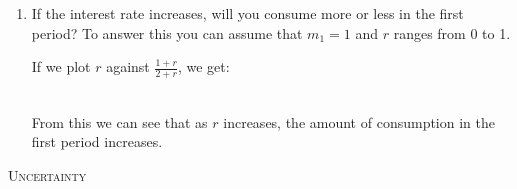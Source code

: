 \documentclass[12pt]{article}
\newcommand{\topic}[1]{\medskip\begin{center}\large\textsc{#1}\normalsize
  \end{center}}
\newcounter{question}[section]
\newcommand{\question}[1]{\refstepcounter{question}
  \subsubsection*{Question~\thequestion~-- #1}}
\newenvironment{subquestions}{
  \begin{enumerate}[label=(\roman*)]}{\end{enumerate}}
\begin{document}
\begin{subquestions}
    \textcolor{solution-color}{
      The first equation is:
      \begin{align*}
      \frac{c_1}{\beta c_2} &= 1+r \\
      \frac{c_1}{c_2} &=\beta \left(1+r\right)
      \end{align*}
      Since $\beta=\frac{1}{1+r}$, we know that $\beta\left( 1+r \right)=1$.
      Then this becomes $c_1=c_2$. Putting this in the budget constraint:
      \begin{align*}
         c_1 + \frac{c_2}{1+r} &= m_1 \\
         c_1 + \frac{c_1}{1+r} &= m_1 \\
         c_1 \left( 1+\frac{1}{1+r} \right) &= m_1 \\
         c_1 \left( \frac{1+r}{1+r}+\frac{1}{1+r} \right) &= m_1 \\
         c_1 \left( \frac{2+r}{1+r}\right) &= m_1 \\
         c_1  &= m_1\left( \frac{1+r}{2+r}\right) \\
      \end{align*}
    }
  \item If the interest rate increases, will you consume more or less in the
    first period?  To answer this you can assume that $m_1=1$ and $r$ ranges
    from 0 to 1.

    \textcolor{solution-color}{
      If we plot $r$ against $\frac{1+r}{2+r}$, we get:
      \\
      \\
      From this we can see that as $r$ increases, the amount of consumption in
      the first period increases.
    }
\end{subquestions}
\topic{Uncertainty}
\end{document}
